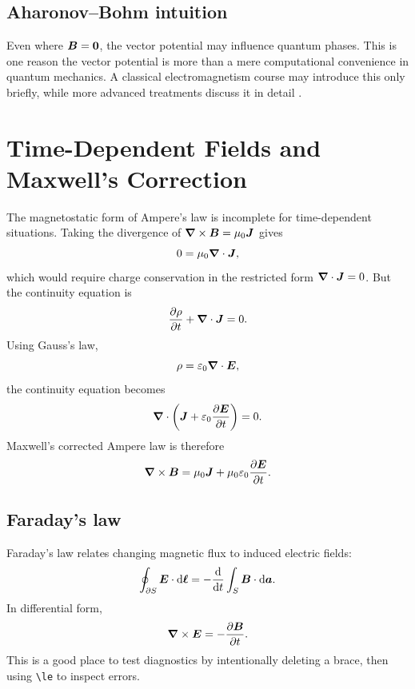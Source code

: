 \subsection{Aharonov--Bohm intuition}

Even where \(\bm{B} = \bm{0}\), the vector potential may influence quantum phases.
This is one reason the vector potential is more than a mere computational convenience in quantum mechanics.
A classical electromagnetism course may introduce this only briefly, while more advanced treatments discuss it in detail \cite{jackson1999}.

\newpage

\section{Time-Dependent Fields and Maxwell's Correction}
\label{sec:time-dependent}

The magnetostatic form of Ampere's law is incomplete for time-dependent situations.
Taking the divergence of \(\bm{\nabla} \times\bm{B}=\mu_0\bm{J}\) gives
\begin{equation}
  0 = \mu_0 \bm{\nabla} \cdot \bm{J},
\end{equation}
which would require charge conservation in the restricted form \(\bm{\nabla} \cdot\bm{J}=0\).
But the continuity equation is
\begin{equation}
  \frac{\partial \rho}{\partial t} + \bm{\nabla} \cdot\bm{J} = 0.
  \label{eq:continuity}
\end{equation}
Using Gauss's law,
\begin{equation}
  \rho = \varepsilon_0 \bm{\nabla} \cdot\bm{E},
\end{equation}
the continuity equation becomes
\begin{equation}
  \bm{\nabla} \cdot
  \left(
    \bm{J} + \varepsilon_0\frac{\partial\bm{E}}{\partial t}
  \right)
  =
  0.
\end{equation}
Maxwell's corrected Ampere law is therefore
\begin{equation}
  \bm{\nabla} \times \bm{B}
  =
  \mu_0\bm{J}
  +
  \mu_0\varepsilon_0
  \frac{\partial\bm{E}}{\partial t}.
  \label{eq:maxwell-ampere}
\end{equation}

\subsection{Faraday's law}

Faraday's law relates changing magnetic flux to induced electric fields:
\begin{equation}
  \oint_{\partial S}\bm{E}\cdot \mathop{}\!\mathrm{d}\bm{\ell}
  =
  -
  \frac{\mathop{}\!\mathrm{d}}{\mathop{}\!\mathrm{d} t}
  \int_S \bm{B}\cdot\mathop{}\!\mathrm{d}\bm{a}.
  \label{eq:faraday-integral}
\end{equation}
In differential form,
\begin{equation}
  \bm{\nabla} \times\bm{E}
  =
  -
  \frac{\partial\bm{B}}{\partial t}.
  \label{eq:faraday-differential}
\end{equation}
This is a good place to test diagnostics by intentionally deleting a brace, then using \texttt{\textbackslash le} to inspect errors.

